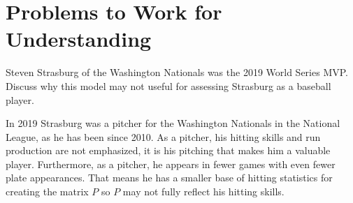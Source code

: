 \documentclass[12pt]{article}
\begin{document}
\section*{Problems to Work for Understanding}
\renewcommand{\theexerciseseries}{}
\renewcommand{\theexercise}{\arabic{exercise}}

\begin{exercise}
    Steven Strasburg of the Washington Nationals was the 2019 World
    Series MVP\@.  Discuss why this model may not useful for assessing
    Strasburg as a baseball player.
\end{exercise}
\begin{solution}
    In 2019 Strasburg was a pitcher for the Washington Nationals in the
    National League, as he has been since 2010.  As a pitcher, his
    hitting skills and run production are not emphasized, it is his
    pitching that makes him a valuable player.  Furthermore, as a
    pitcher, he appears in fewer games with even fewer plate
    appearances.  That means he has a smaller base of hitting statistics
    for creating the matrix \( P \) so \( P \) may not fully reflect his
    hitting skills.
\end{solution}
\end{document}
